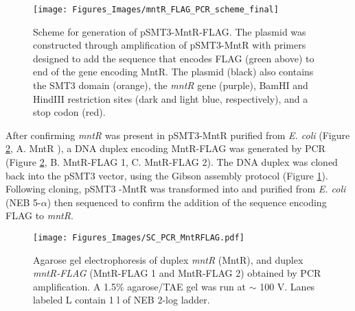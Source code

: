 \documentclass[12pt,twoside]{reedthesis}
\begin{document}
  
    	\begin{figure}[h]
    		
    		\centering
    		\texttt{[image: Figures\_Images/mntR\_FLAG\_PCR\_scheme\_final]}
    		\caption[MntR-FLAG PCR Scheme]{Scheme for generation of pSMT3-MntR-FLAG. The plasmid was constructed through amplification of pSMT3-MntR with primers designed to add the sequence that encodes FLAG (green above) to end of the gene encoding MntR. The plasmid (black) also contains the SMT3 domain (orange), the \textit{mntR} gene (purple), BamHI and HindIII restriction sites (dark and light blue, respectively), and a stop codon (red).} 
    		\label{MntRFLAG_Scheme}
    	\end{figure}
    	
  \clearpage
  
  After confirming \textit{mntR} was present in pSMT3-MntR purified from \textit{E. coli} (Figure \ref{PCRMntRFLAG}, A. MntR ), a DNA duplex encoding MntR-FLAG was generated by PCR (Figure \ref{PCRMntRFLAG}, B. MntR-FLAG 1, C. MntR-FLAG 2). The DNA duplex was cloned back into the pSMT3 vector, using the Gibson assembly protocol (Figure \ref{MntRFLAG_Scheme}). Following cloning, pSMT3 -MntR was transformed into and purified from \textit{E. coli} (NEB 5-$\alpha$) then sequenced to confirm the addition of the sequence encoding FLAG to \textit{mntR}. 
        	\begin{figure}[h!tbp]
        		\centering
        		\texttt{[image: Figures\_Images/SC\_PCR\_MntRFLAG.pdf]}
        		\caption[PCR to Create MntR-FLAG]{Agarose gel electrophoresis of duplex \textit{mntR} (MntR), and duplex \textit{mntR-FLAG} (MntR-FLAG 1 and MntR-FLAG 2) obtained by PCR amplification. A 1.5\% agarose/TAE gel was run at $\sim$ 100 V. Lanes labeled L contain 1 \micro l of NEB 2-log ladder.}
        		\label{PCRMntRFLAG}
        	\end{figure}
        	
\end{document}
